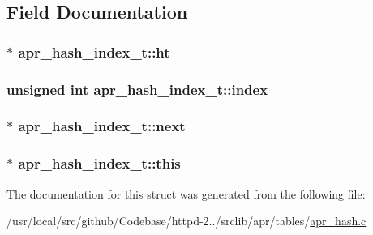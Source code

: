\subsection{Field Documentation}
\subsubsection[{\texorpdfstring{ht}{ht}}]{$\ast$ apr\+\_\+hash\+\_\+index\+\_\+t\+::ht}\hypertarget{structapr__hash__index__t_a68155ad0c66ebf1e6f52bc66c8564d02}{}\label{structapr__hash__index__t_a68155ad0c66ebf1e6f52bc66c8564d02}
\subsubsection[{\texorpdfstring{index}{index}}]{\setlength{\rightskip}{0pt plus 5cm}unsigned {\bf int} apr\+\_\+hash\+\_\+index\+\_\+t\+::index}\hypertarget{structapr__hash__index__t_a1e0bcc3b2fc81e31f903fe064295c6f8}{}\label{structapr__hash__index__t_a1e0bcc3b2fc81e31f903fe064295c6f8}
\subsubsection[{\texorpdfstring{next}{next}}]{ $\ast$ apr\+\_\+hash\+\_\+index\+\_\+t\+::next}\hypertarget{structapr__hash__index__t_a12df866db16de0f9b835c094e6ec9399}{}\label{structapr__hash__index__t_a12df866db16de0f9b835c094e6ec9399}
\subsubsection[{\texorpdfstring{this}{this}}]{$\ast$ apr\+\_\+hash\+\_\+index\+\_\+t\+::this}\hypertarget{structapr__hash__index__t_aa465bf08ed0774a74d491e06b2e60a41}{}\label{structapr__hash__index__t_aa465bf08ed0774a74d491e06b2e60a41}


The documentation for this struct was generated from the following file\+:\begin{DoxyCompactItemize}
\item 
/usr/local/src/github/\+Codebase/httpd-\/2../srclib/apr/tables/\hyperlink{apr__hash_8c}{apr\+\_\+hash.\+c}\end{DoxyCompactItemize}
